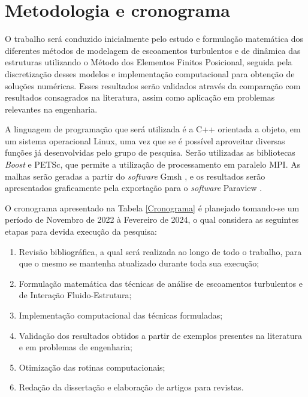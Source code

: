 \documentclass[_ArquivoPrincipal.tex]{subfiles}
\begin{document}
\chapter{Metodologia e cronograma} \label{MetodologiaCronograma}

O trabalho será conduzido inicialmente pelo estudo e formulação matemática dos diferentes métodos de modelagem de escoamentos turbulentos e de dinâmica das estruturas utilizando o Método dos Elementos Finitos Posicional, seguida pela discretização desses modelos e implementação computacional para obtenção de soluções numéricas. Esses resultados serão validados através da comparação com resultados consagrados na literatura, assim como aplicação em problemas relevantes na engenharia.

A linguagem de programação que será utilizada é a C++ orientada a objeto, em um sistema operacional Linux, uma vez que se é possível aproveitar diversas funções já desenvolvidas pelo grupo de pesquisa. Serão utilizadas as bibliotecas \textit{Boost} e PETSc, que permite a utilização de processamento em paralelo MPI. As malhas serão geradas a partir do \textit{software} Gmsh \cite{geuzaine2009gmsh}, e os resultados serão apresentados graficamente pela exportação para o \textit{software} Paraview \cite{ahrens2005paraview}.

O cronograma apresentado na Tabela \ref{Cronograma} é planejado tomando-se um período de Novembro de 2022 à Fevereiro de 2024, o qual considera as seguintes etapas para devida execução da pesquisa:

\begin{enumerate}[label=\alph*.]
	\item\label{M:2} Revisão bibliográfica, a qual será realizada ao longo de todo o trabalho, para que o mesmo se mantenha atualizado durante toda sua execução;
	\item\label{M:3} Formulação matemática das técnicas de análise de escoamentos turbulentos e de Interação Fluido-Estrutura;
	\item\label{M:5} Implementação computacional das técnicas formuladas;
	\item\label{M:6} Validação dos resultados obtidos a partir de exemplos presentes na literatura e em problemas de engenharia;
	\item\label{M:7} Otimização das rotinas computacionais;
	\item\label{M:8} Redação da dissertação e elaboração de artigos para revistas.
\end{enumerate}
\end{document}
